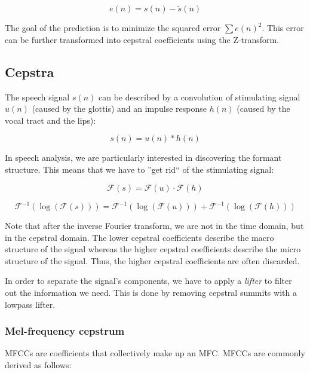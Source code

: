 \begin{equation}
    e(n) = s(n) - \tilde{s}(n)
\end{equation}

The goal of the prediction is to minimize the squared error $\sum e(n)^2$. This error can be further transformed into cepstral coefficients using the Z-transform.

\subsection{Cepstra}

The speech signal $s(n)$ can be described by a convolution of stimulating signal $u(n)$ (caused by the glottis) and an impulse response $h(n)$ (caused by the vocal tract and the lips):

\begin{equation}
    s(n) = u(n) \ast h(n)
\end{equation}

In speech analysis, we are particularly interested in discovering the formant structure. This means that we have to ''get rid`` of the stimulating signal:

\begin{equation}
    \mathcal{F}(s) = \mathcal{F}(u) \cdot \mathcal{F}(h)
\end{equation}

\begin{equation}
    \mathcal{F}^{-1}(\log(\mathcal{F}(s))) = \mathcal{F}^{-1}(\log(\mathcal{F}(u))) + \mathcal{F}^{-1}(\log(\mathcal{F}(h)))
\end{equation}

Note that after the inverse Fourier transform, we are not in the time domain, but in the cepstral domain. The lower cepstral coefficients describe the macro structure of the signal whereas the higher cepstral coefficients describe the micro structure of the signal. Thus, the higher cepstral coefficients are often discarded.

In order to separate the signal's components, we have to apply a \textit{lifter} to filter out the information we need. This is done by removing cepstral summits with a lowpass lifter.

\subsubsection{Mel-frequency cepstrum}

MFCCs are coefficients that collectively make up an MFC. MFCCs are commonly derived as follows:

